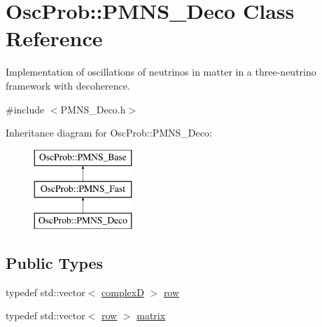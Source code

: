 \hypertarget{classOscProb_1_1PMNS__Deco}{}\section{Osc\+Prob\+:\+:P\+M\+N\+S\+\_\+\+Deco Class Reference}
\label{classOscProb_1_1PMNS__Deco}


Implementation of oscillations of neutrinos in matter in a three-\/neutrino framework with decoherence.  




{\ttfamily \#include $<$P\+M\+N\+S\+\_\+\+Deco.\+h$>$}

Inheritance diagram for Osc\+Prob\+:\+:P\+M\+N\+S\+\_\+\+Deco\+:\begin{figure}[H]
\begin{center}
\leavevmode
\includegraphics[height=3.000000cm]{classOscProb_1_1PMNS__Deco}
\end{center}
\end{figure}
\subsection*{Public Types}
\begin{DoxyCompactItemize}
\item 
typedef std\+::vector$<$ \hyperlink{EigenPoint_8h_a67ca8e107e20610c3fff78d5e726ece0}{complexD} $>$ \hyperlink{classOscProb_1_1PMNS__Deco_a430859c3da89582de577f8f7e75f2d16}{row}
\item 
typedef std\+::vector$<$ \hyperlink{classOscProb_1_1PMNS__Deco_a430859c3da89582de577f8f7e75f2d16}{row} $>$ \hyperlink{classOscProb_1_1PMNS__Deco_a77b4e0c041b6268910a270be0f5387c9}{matrix}
\end{DoxyCompactItemize}
